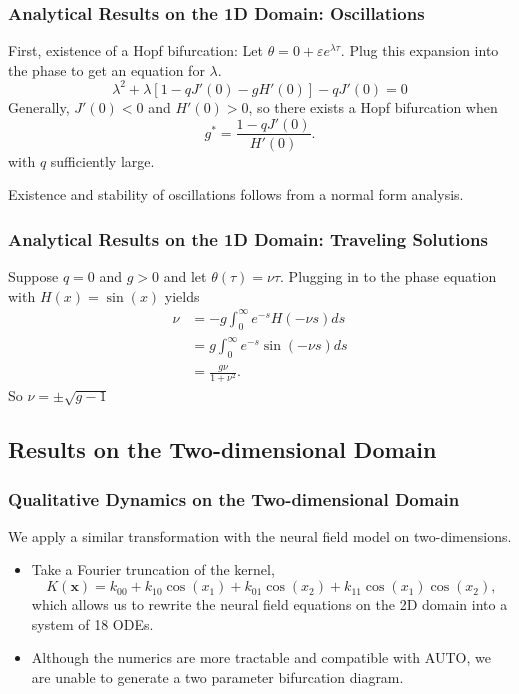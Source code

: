 \documentclass{beamer}
\newcommand{\x}{\mathbf{x}}
\newcommand{\ve}{\varepsilon}
\begin{document}
\begin{frame}
 \frametitle{Analytical Results on the 1D Domain: Oscillations}
 First, existence of a Hopf bifurcation:
 Let $\theta = 0 + \ve e^{\lambda \tau}$. Plug this expansion into the phase to get an equation for $\lambda$.
\begin{equation*}
\lambda^2 + \lambda[1-qJ'(0)-gH'(0)] - qJ'(0) = 0
\end{equation*}
Generally, $J'(0) < 0$ and $H'(0) > 0$, so there exists a Hopf bifurcation when
\begin{equation*}
 g^* = \frac{1-qJ'(0)}{H'(0)}.
\end{equation*}
with $q$ sufficiently large.

Existence and stability of oscillations follows from a normal form analysis.
\end{frame}

\begin{frame}
\frametitle{Analytical Results on the 1D Domain: Traveling Solutions}
Suppose $q=0$ and $g > 0$ and let $\theta(\tau) = \nu\tau$. Plugging in to the phase equation  with $H(x) = \sin(x)$ yields
\begin{align*}
 \nu &= -g \int_0^\infty e^{-s} H(-\nu s)ds\\
 &= g \int_0^\infty e^{-s} \sin(-\nu s)ds\\
 &= \frac{g\nu}{1+\nu^2}.
\end{align*}
So $\nu = \pm \sqrt{g-1}$
\end{frame}



\subsection{Results on the Two-dimensional Domain}

\begin{frame}
\frametitle{Qualitative Dynamics on the Two-dimensional Domain}
We apply a similar transformation with the neural field model on two-dimensions.

\begin{itemize}
 \item<1-> Take a Fourier truncation of the kernel,
\begin{equation*}
 K(\x) = k_{00} + k_{10}\cos(x_1) + k_{01}\cos(x_2) + k_{11}\cos(x_1)\cos(x_2),
\end{equation*}
which allows us to rewrite the neural field equations on the 2D domain into a system of 18 ODEs.
 \item<2-> Although the numerics are more tractable and compatible with AUTO, we are unable to generate a two parameter bifurcation diagram.
\end{itemize}
\end{frame}
\end{document}
